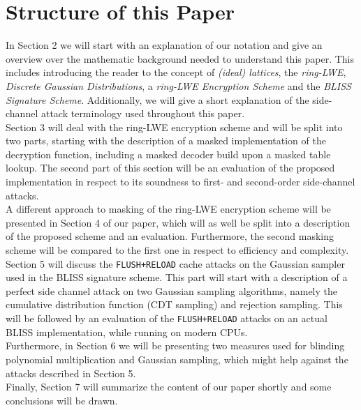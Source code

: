 \section{Structure of this Paper}
In Section 2 we will start with an explanation of our notation and give an overview over the mathematic background needed to understand this paper. This includes introducing the reader to the concept of \textit{(ideal) lattices}, the \textit{\ac{ring-LWE}}, \textit{Discrete Gaussian Distributions}, a \textit{\ac{ring-LWE} Encryption Scheme} and the \textit{BLISS Signature Scheme}. Additionally, we will give a short explanation of the side-channel attack terminology used throughout this paper.\\ 
Section 3 will deal with the ring-LWE encryption scheme and will be split into two parts, starting with the description of a masked implementation of the decryption function, including a masked decoder build upon a masked table lookup. The second part of this section will be an evaluation of the proposed implementation in respect to its soundness to first- and second-order side-channel attacks.\\ 
A different approach to masking of the \ac{ring-LWE} encryption scheme will be presented in Section 4 of our paper, which will as well be split into a description of the proposed scheme and an evaluation. Furthermore, the second masking scheme will be compared to the first one in respect to efficiency and complexity.\\
Section 5 will discuss the \verb|FLUSH+RELOAD| cache attacks on the Gaussian sampler used in the BLISS signature scheme. This part will start with a description of a perfect side channel attack on two Gaussian sampling algorithms, namely the cumulative distribution function (CDT sampling) and rejection sampling. This will be followed by an evaluation of the \verb|FLUSH+RELOAD| attacks on an actual BLISS implementation, while running on modern CPUs.\\
Furthermore, in Section 6 we will be presenting two measures used for blinding polynomial multiplication and Gaussian sampling, which might help against the attacks described in Section 5.\\
Finally, Section 7 will summarize the content of our paper shortly and some conclusions will be drawn.